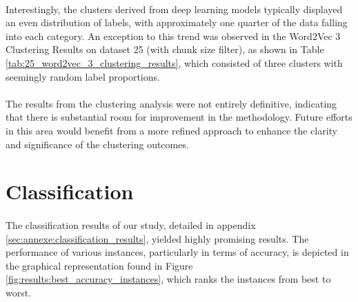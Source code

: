 \paragraph{}Interestingly, the clusters derived from deep learning models typically displayed an even distribution of labels, with approximately one quarter of the data falling into each category. An exception to this trend was observed in the Word2Vec 3 Clustering Results on dataset 25 (with chunk size filter), as shown in Table \ref{tab:25_word2vec_3_clustering_results}, which consisted of three clusters with seemingly random label proportions.

\paragraph{}The results from the clustering analysis were not entirely definitive, indicating that there is substantial room for improvement in the methodology. Future efforts in this area would benefit from a more refined approach to enhance the clarity and significance of the clustering outcomes.

\section{Classification}

\paragraph{}The classification results of our study, detailed in appendix \ref{sec:annexe:classification_results}, yielded highly promising results. The performance of various instances, particularly in terms of accuracy, is depicted in the graphical representation found in Figure \ref{fig:results:best_accuracy_instances}, which ranks the instances from best to worst.

